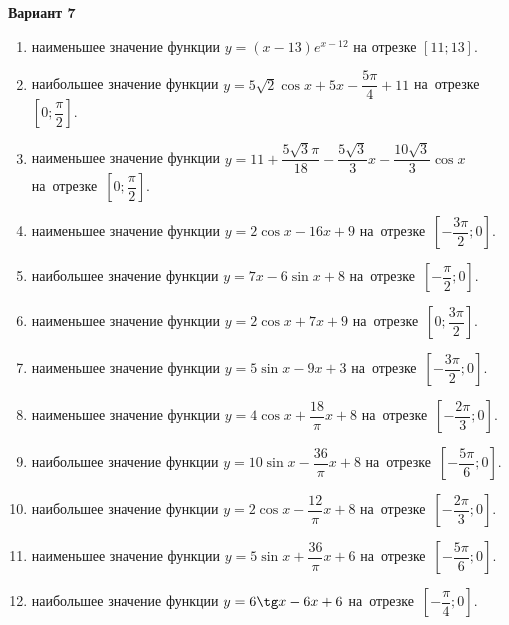 \documentclass[a4paper,10pt]{article}
\begin{document}
\begin{center}\Large\textbf{Вариант 7}\end{center}

\begin{enumerate}
\item {} наименьшее значение функции $y=\left(x-13\right)e^{x-12}$ на отрезке $\left[11;13\right]$.

\item {} наибольшее значение функции $y=5\sqrt{2}\cos x+5x-\dfrac{5\pi }{4}+11$ на~отрезке~$\left[0;\dfrac{\pi }{2}\right]$.

\item {} наименьшее значение функции $y=11+\dfrac{5\sqrt{3}\pi }{18}-\dfrac{5\sqrt{3}}{3}x-\dfrac{10\sqrt{3}}{3}\cos x$ на~отрезке~$\left[0;\dfrac{\pi }{2}\right]$.

\item {} наименьшее значение функции $y=2\cos x-16x+9$ на~отрезке~$\left[-\dfrac{3\pi }{2};0\right]$.

\item {} наибольшее значение функции $y=7x-6\sin x+8$ на~отрезке~$\left[-\dfrac{\pi }{2};0\right]$.

\item {} наименьшее значение функции $y=2\cos x+7x+9$ на~отрезке~$\left[0;\dfrac{3\pi }{2}\right]$.

\item {} наименьшее значение функции $y=5\sin x-9x+3$ на~отрезке~$\left[-\dfrac{3\pi }{2};0\right]$.

\item {} наименьшее значение функции $y=4\cos x+\dfrac{18}{\pi }x+8$ на~отрезке~$\left[-\dfrac{2\pi }{3};0\right]$.

\item {} наибольшее значение функции $y=10\sin x-\dfrac{36}{\pi }x+8$ на~отрезке~$\left[-\dfrac{5\pi }{6};0\right]$.

\item {} наибольшее значение функции $y=2\cos x-\dfrac{12}{\pi }x+8$ на~отрезке~$\left[-\dfrac{2\pi }{3};0\right]$.

\item {} наименьшее значение функции $y=5\sin x+\dfrac{36}{\pi }x+6$ на~отрезке~$\left[-\dfrac{5\pi }{6};0\right]$.

\item {} наибольшее значение функции $y=6\tg x-6x+6$ на~отрезке~$\left[-\dfrac{\pi }{4};0\right]$.


\end{enumerate}
\end{document}
